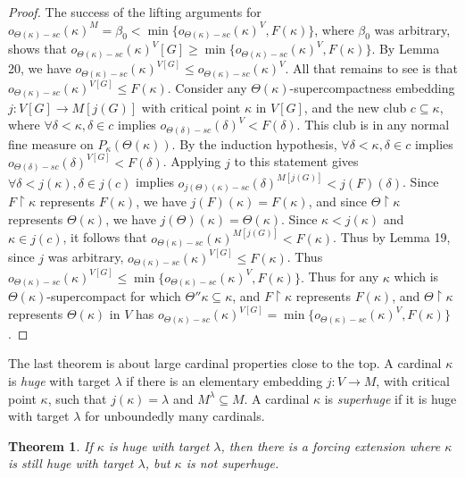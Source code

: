 \documentclass[10pt,leqno]{amsart}
\newtheorem{theorem}{Theorem}[]
\begin{document}
\begin{proof}
 The success of the lifting arguments for $o_{\Theta(\kappa)-sc}(\kappa)^M = \beta_0 < \min\{o_{\Theta(\kappa)-sc}(\kappa)^V, F(\kappa)\}$, where $\beta_0$ was arbitrary, shows that $o_{\Theta(\kappa)-sc}(\kappa)^V[G] \ge \min\{o_{\Theta(\kappa)-sc}(\kappa)^V, F(\kappa)\}$. By Lemma 20, we have $o_{\Theta(\kappa)-sc}(\kappa)^{V[G]} \le o_{\Theta(\kappa)-sc}(\kappa)^V$. All that remains to see is that $o_{\Theta(\kappa)-sc}(\kappa)^{V[G]} \le F(\kappa)$. Consider any $\Theta(\kappa)$-supercompactness embedding $j:V[G] \to M[j(G)]$ with critical point $\kappa$ in $V[G]$, and the new club $c \subseteq \kappa$, where $\forall \delta < \kappa, \delta \in c$ implies $o_{\Theta(\delta)-sc}(\delta)^V < F(\delta)$. This club is in any normal fine measure on $P_{\kappa}(\Theta(\kappa))$. By the induction hypothesis, $\forall \delta < \kappa, \delta \in c$ implies $o_{\Theta(\delta)-sc}(\delta)^{V[G]} < F(\delta)$. Applying $j$ to this statement gives $\forall \delta < j(\kappa), \delta \in j(c)$ implies $o_{j(\Theta)(\kappa)-sc}(\delta)^{M[j(G)]} < j(F)(\delta)$. Since $F \upharpoonright \kappa$ represents $F(\kappa)$, we have $j(F)(\kappa) = F(\kappa)$, and since $\Theta \upharpoonright \kappa$ represents $\Theta(\kappa)$, we have $j(\Theta)(\kappa) = \Theta(\kappa)$. Since $\kappa < j(\kappa)$ and $\kappa \in j(c)$, it follows that $o_{\Theta(\kappa)-sc}(\kappa)^{M[j(G)]} < F(\kappa)$. Thus by Lemma 19, since $j$ was arbitrary, $o_{\Theta(\kappa)-sc}(\kappa)^{V[G]} \le F(\kappa)$. Thus $o_{\Theta(\kappa)-sc}(\kappa)^{V[G]} \le \min\{o_{\Theta(\kappa)-sc}(\kappa)^V, F(\kappa)\}.$ Thus for any $\kappa$ which is $\Theta(\kappa)$-supercompact for which $\Theta''\kappa \subseteq \kappa$, and $F \upharpoonright \kappa$ represents $F(\kappa)$, and $\Theta \upharpoonright \kappa$ represents $\Theta(\kappa)$ in $V$ has $o_{\Theta(\kappa)-sc}(\kappa)^{V[G]} = \min\{o_{\Theta(\kappa)-sc}(\kappa)^V, F(\kappa)\}$.
 \end{proof}

 The last theorem is about large cardinal properties close to the top. A cardinal $\kappa$ is \textit{huge} with target $\lambda$ if there is an elementary embedding $j:V \to M$, with critical point $\kappa$, such that $j(\kappa) = \lambda$ and $M^{\lambda} \subseteq M$. A cardinal $\kappa$ is \textit{superhuge} if it is huge with target $\lambda$ for unboundedly many cardinals. 

 \begin{theorem} If $\kappa$ is huge with target $\lambda$, then there is a forcing extension where $\kappa$ is still huge with target $\lambda$, but $\kappa$ is not superhuge.
 \end{theorem}
\end{document}

